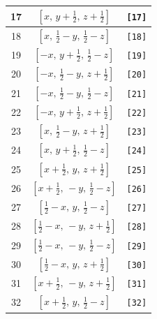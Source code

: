 \documentclass[fleqn,8pt]{jsarticle}
\begin{document}
\begin{longtable}{ccc}
17 & $\left[ x,\, y + \frac{1}{2},\, z + \frac{1}{2} \right]$ & {\tt [17]} \\ \hline
18 & $\left[ x,\, \frac{1}{2} - y,\, \frac{1}{2} - z \right]$ & {\tt [18]} \\ \hline
19 & $\left[ - x,\, y + \frac{1}{2},\, \frac{1}{2} - z \right]$ & {\tt [19]} \\ \hline
20 & $\left[ - x,\, \frac{1}{2} - y,\, z + \frac{1}{2} \right]$ & {\tt [20]} \\ \hline
21 & $\left[ - x,\, \frac{1}{2} - y,\, \frac{1}{2} - z \right]$ & {\tt [21]} \\ \hline
22 & $\left[ - x,\, y + \frac{1}{2},\, z + \frac{1}{2} \right]$ & {\tt [22]} \\ \hline
23 & $\left[ x,\, \frac{1}{2} - y,\, z + \frac{1}{2} \right]$ & {\tt [23]} \\ \hline
24 & $\left[ x,\, y + \frac{1}{2},\, \frac{1}{2} - z \right]$ & {\tt [24]} \\ \hline
25 & $\left[ x + \frac{1}{2},\, y,\, z + \frac{1}{2} \right]$ & {\tt [25]} \\ \hline
26 & $\left[ x + \frac{1}{2},\, - y,\, \frac{1}{2} - z \right]$ & {\tt [26]} \\ \hline
27 & $\left[ \frac{1}{2} - x,\, y,\, \frac{1}{2} - z \right]$ & {\tt [27]} \\ \hline
28 & $\left[ \frac{1}{2} - x,\, - y,\, z + \frac{1}{2} \right]$ & {\tt [28]} \\ \hline
29 & $\left[ \frac{1}{2} - x,\, - y,\, \frac{1}{2} - z \right]$ & {\tt [29]} \\ \hline
30 & $\left[ \frac{1}{2} - x,\, y,\, z + \frac{1}{2} \right]$ & {\tt [30]} \\ \hline
31 & $\left[ x + \frac{1}{2},\, - y,\, z + \frac{1}{2} \right]$ & {\tt [31]} \\ \hline
32 & $\left[ x + \frac{1}{2},\, y,\, \frac{1}{2} - z \right]$ & {\tt [32]} \\
\end{longtable}
\end{document}
